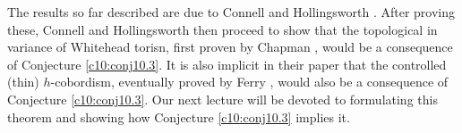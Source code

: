 \begin{remark*}
  The results so far described are due to Connell and Holl\-ings\-worth
  \cite{20}. After proving these, Connell and Hollingsworth then
  proceed to show that the topological in variance of Whitehead
  torisn, first proven by Chapman \cite{18}, would be a consequence of
  Conjecture \ref{c10:conj10.3}. It is also implicit in their paper
  that the controlled (thin) $h$-cobor\-dism, eventually proved by Ferry
  \cite{57}, would also be a consequence of Conjecture
  \ref{c10:conj10.3}. Our next lecture will be devoted to formulating this
  theorem and showing how Conjecture \ref{c10:conj10.3} implies it.
\end{remark*}
